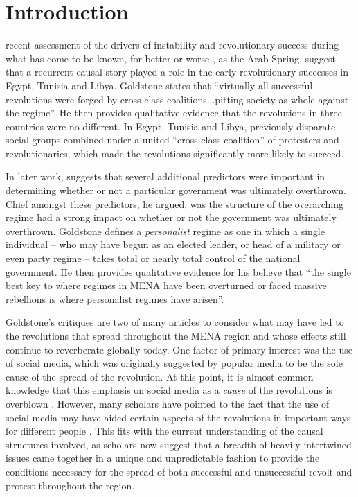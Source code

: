 \section{Introduction}

 recent assessment of the drivers of instability and revolutionary success during what has come to be known, for better or worse \cite{gelvin_arab_2015}, as the Arab Spring, suggest that a recurrent causal story played a role in the early revolutionary successes in Egypt, Tunisia and Libya.  Goldstone states that ``virtually all successful revolutions were forged by cross-class coalitions...pitting society as whole against the regime''. He then provides qualitative evidence that the revolutions in three countries were no different.  In Egypt, Tunisia and Libya, previously disparate social groups combined under a united ``cross-class coalition'' of protesters and revolutionaries, which made the revolutions significantly more likely to succeed.

In later work, \citeauthor{goldstone_bringing_2013} \citeyearpar{goldstone_bringing_2013} suggests that several additional predictors were important in determining whether or not a particular government was ultimately overthrown.  Chief amongst these predictors, he argued, was the structure of the overarching regime had a strong impact on whether or not the government was ultimately overthrown.  Goldstone defines a \emph{personalist} regime as one in which a single individual – who may have begun as an elected leader, or head of a military or even party regime – takes total or nearly total control of the national government. He then provides qualitative evidence for his believe that ``the single best key to where regimes in MENA have been overturned or faced massive rebellions is where personalist regimes have arisen''.
 
Goldstone's critiques are two of many articles to consider what may have led to the revolutions that spread throughout the MENA region and whose effects still continue to reverberate globally today. One factor of primary interest was the use of social media, which was originally suggested by popular media to be the sole cause of the spread of the revolution. At this point, it is almost common knowledge that this emphasis on social media as a \emph{cause} of the revolutions is overblown \citep{bruns_arab_2013,goldstone_bringing_2013,comunello_will_2012}. However, many scholars have pointed to the fact that the use of social media may have aided certain aspects of the revolutions in important ways for different people  \citep{galle_who_2013,starbird_how_2012,lotan_revolutions_2011,tufekci_social_2012}.  This fits with the current understanding of the causal structures involved,  as scholars now suggest that a breadth of heavily intertwined issues came together in a unique and unpredictable fashion to provide the conditions necessary for the spread of both successful and unsuccessful revolt and protest throughout the region. 

